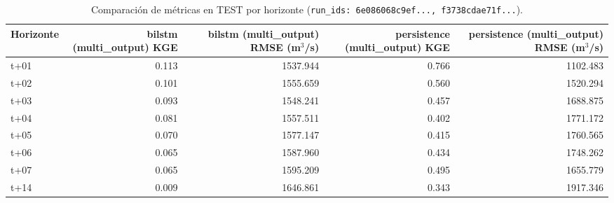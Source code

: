 \begin{table}[H]
\centering
\caption{Comparaci\'on de m\'etricas en TEST por horizonte (\texttt{run\_ids: 6e086068c9ef..., f3738cdae71f...}).}
\label{tab:compare-6e086068c9ef}
\begin{tabular}{lrrrr}
\toprule
Horizonte & bilstm (multi\_output) KGE & bilstm (multi\_output) RMSE (m$^3$/s) & persistence (multi\_output) KGE & persistence (multi\_output) RMSE (m$^3$/s) \\
\midrule
t+01 & 0.113 & 1537.944 & 0.766 & 1102.483 \\
t+02 & 0.101 & 1555.659 & 0.560 & 1520.294 \\
t+03 & 0.093 & 1548.241 & 0.457 & 1688.875 \\
t+04 & 0.081 & 1557.511 & 0.402 & 1771.172 \\
t+05 & 0.070 & 1577.147 & 0.415 & 1760.565 \\
t+06 & 0.065 & 1587.960 & 0.434 & 1748.262 \\
t+07 & 0.065 & 1595.209 & 0.495 & 1655.779 \\
t+14 & 0.009 & 1646.861 & 0.343 & 1917.346 \\
\bottomrule
\end{tabular}
\end{table}
